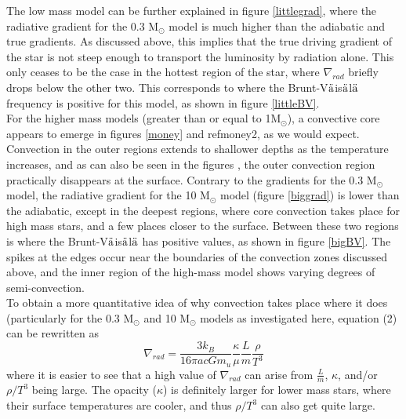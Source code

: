 \documentclass[12pt]{article}
\begin{document}
\noindent
The low mass model can be further explained
in figure \ref{littlegrad}, where the radiative gradient
for the 0.3 M$_{\odot}$ model
is much higher than the adiabatic and true
gradients. As discussed above, this implies that the true driving
gradient of the star is not steep enough to transport the luminosity
by radiation alone. This only ceases to be the case in the hottest
region of the star, where $\nabla_{rad}$ briefly drops below the other
two. This corresponds to where the
Brunt-V$\ddot{\rm a}$is$\ddot{\rm a}$l$\ddot{\rm a}$
frequency
is positive for this model, as shown in figure \ref{littleBV}. \\

\noindent
For the higher mass models (greater than or equal to 1M$_{\odot}$), a
convective core appears to emerge in figures \ref{money} and ref{money2},
as we would expect. Convection in
the outer regions extends to shallower depths as the temperature
increases, and as can also be seen in the figures
, the outer convection region practically disappears at
the surface. Contrary to the gradients for the 0.3 M$_{\odot}$ model, the
radiative gradient for the 10 M$_{\odot}$ model (figure \ref{biggrad})
is lower than the adiabatic,
except in the deepest regions, where core convection takes place for
high mass stars, and a few places closer to the surface. Between these
two regions is where the
Brunt-V$\ddot{\rm a}$is$\ddot{\rm a}$l$\ddot{\rm a}$
has positive values, as shown in figure \ref{bigBV}. The spikes at the
edges occur near the boundaries of the convection zones discussed
above, and the inner region of the high-mass model shows varying
degrees of semi-convection. \\

\noindent
To obtain a more quantitative idea of why convection takes place where it
does (particularly for the 0.3 M$_{\odot}$ and 10 M$_{\odot}$
models as investigated here,
equation (2) can be rewritten as
\begin{equation}
  \nabla_{rad} = \frac{3k_B}{16\pi acGm_u}\frac{\kappa}{\mu}
                 \frac{L}{m}\frac{\rho}{T^3}
\end{equation}
where it is easier to see that a high value of
$\nabla_{rad}$ can arise from $\frac{L}{m}$,
 $\kappa$, and/or $\rho/T^3$ being large.
The opacity ($\kappa$) is definitely larger for lower mass stars,
where their surface temperatures are cooler, and thus $\rho/T^3$
can also get quite large.\\
\end{document}
